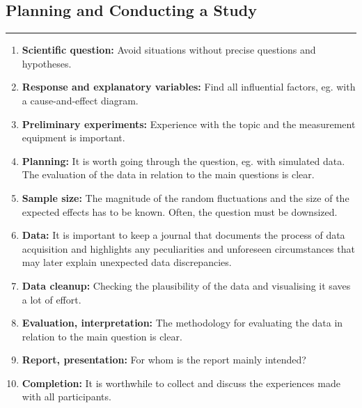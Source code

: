 \subsection{Planning and Conducting a Study}
\noindent\rule[\linienAbstand]{\linewidth}{\linienDicke}
\begin{enumerate}
  \item \textbf{Scientific question:} Avoid situations without precise questions and hypotheses.
  \item \textbf{Response and explanatory variables:} Find all influential factors, eg. with a cause-and-effect diagram.
  \item \textbf{Preliminary experiments:} Experience with the topic and the measurement equipment is important.
  \item \textbf{Planning:} It is worth going through the question, eg. with simulated data. The evaluation of the data in relation to the main questions is clear.
  \item \textbf{Sample size:} The magnitude of the random fluctuations and the size of the expected effects has to be known. Often, the question must be downsized.
  \item \textbf{Data:} It is important to keep a journal that documents the process of data acquisition and highlights any peculiarities and unforeseen circumstances that may later explain unexpected data discrepancies.
  \item \textbf{Data cleanup:} Checking the plausibility of the data and visualising it saves a lot of effort.
  \item \textbf{Evaluation, interpretation:} The methodology for evaluating the data in relation to the main question is clear.
  \item \textbf{Report, presentation:} For whom is the report mainly intended?
  \item \textbf{Completion:} It is worthwhile to collect and discuss the experiences made with all participants.
\end{enumerate}
